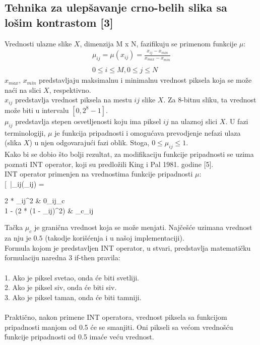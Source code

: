 \documentclass[12pt,a4paper]{article}
\theoremstyle{definition}
\theoremstyle{remark}
\theoremstyle{plain}
\begin{document}
\newpage
\subsection{Tehnika za ulep\v savanje crno-belih slika sa lo\v sim kontrastom [3]}

Vrednosti ulazne slike $X$, dimenzija M x N, fazifikuju se primenom funkcije $\mu$:\\
\begin{align*}
  \mu_{ij} = \mu(x_{ij}) =  \frac{x_{ij} - x_{min}}{x_{max} - x_{min}}\\ \\
  0\leq i \leq M, 0\leq j \leq N
\end{align*}
$x_{max}$, $x_{min}$ predstavljaju maksimalnu i minimalnu vrednost piksela koja se mo\v ze na\' ci na slici $X$, respektivno.\\
$x_{ij}$ predstavlja vrednost piksela na mestu $ij$ slike $X$. Za 8-bitnu sliku, ta vrednost mo\v ze biti u intervalu $[0, 2^8 - 1]$. \\ 
$\mu_{ij}$ predstavlja stepen osvetljenosti koju ima piksel $ij$ na ulaznoj slici $X$. U fazi terminologiji, $\mu$ je funkcija pripadnosti i omogu\' cava 
prevodjenje nefazi ulaza (slika $X$) u njen odgovaraju\' ci fazi oblik.
Stoga, $0\leq \mu_{ij} \leq 1$.\\

Kako bi se dobio \v sto bolji rezultat, za modifikaciju funkcije pripadnosti se uzima poznati INT operator, koji su predlo\v zili King i Pal 1981. godine [5].\\

INT operator primenjen na vrednostima funkcije pripadnosti $\mu$: \\
[\
  \bar\mu_{ij}(\mu_{ij}) = 
    \begin{cases} 
      2 * \mu_{ij}^2 & 0\leq \mu_{ij}\leq \mu_{c} \\
      1 - (2 * (1 - \mu_{ij})^2) & \mu_{c}\leq \mu_{ij} 
    \end{cases}
\]

Ta\v cka $\mu_{c}$ je grani\v cna vrednost koja se mo\v ze menjati. Naj\v ce\v s\' ce uzimana vrednost za nju je $0.5$ 
(takodje kori\v s\' cenja i u na\v soj implementaciji). \\

Formula kojom je predstavljen INT operator, u stvari, predstavlja matemati\v cku formulaciju
naredna 3 if-then pravila: \\ \\
1. Ako je piksel svetao, onda \'ce biti svetliji.\\
2. Ako je piksel siv, onda \'ce biti siv. \\
3. Ako je piksel taman, onda \'ce biti tamniji.\\ \\
Prakti\v cno, nakon primene INT operatora, vrednost piksela sa funkcijom pripadnosti manjom od 0.5 \' ce se smanjiti. Oni pikseli sa ve\' com vredno\v s\' cu \' 
funkcije pripadnosti od 0.5 ima\' ce ve\' cu vrednost.
\\
\end{document}
